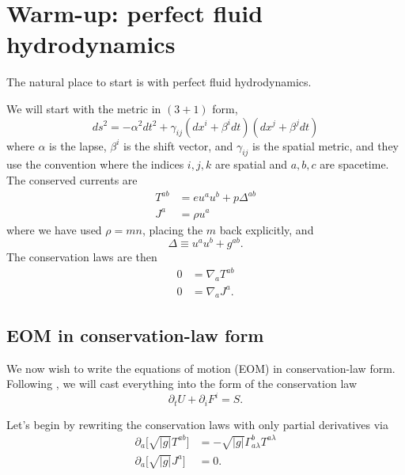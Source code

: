 \documentclass[12pt]{article}
\numberwithin{equation}{section}
\begin{document}
\appendix

\clearpage

\section{Warm-up: perfect fluid hydrodynamics}

The natural place to start is with perfect fluid hydrodynamics.

We will start with the metric in $(3+1)$ form,
\begin{equation}
ds^2 = - \alpha^2 dt^2 + \gamma_{ij} (dx^i + \beta^i dt) (dx^j + \beta^j dt)
\end{equation}
where $\alpha$ is the lapse, $\beta^{i}$ is the shift vector, and $\gamma_{ij}$
is the spatial metric, and they use the convention where the indices $i,j,k$
are spatial and $a,b,c$ are spacetime.
The conserved currents are
\begin{align}
T^{ab} &= e u^a u^b + p \Delta^{ab} \\
J^{a} &= \rho u^a
\end{align}
where we have used $\rho = m n$, placing the $m$ back explicitly, and
\begin{equation}
\Delta \equiv u^a u^b + g^{ab}.
\end{equation}
The conservation laws are then
\begin{align}
0 &= \nabla_{a} T^{ab} \\
0 &= \nabla_{a} J^{a}.
\end{align}

\subsection{EOM in conservation-law form}

We now wish to write the equations of motion (EOM) in conservation-law form.
Following \cite{BaumgarteShapiro}, we will cast everything into the form of the conservation law
\begin{equation}
\partial_t U + \partial_i F^{i} = S.
\end{equation}

Let's begin by rewriting the conservation laws with only partial derivatives via
\begin{align}
\partial_a \big[ \sqrt{|g|} T^{ab} \big] &= -\sqrt{|g|} \Gamma^{b}_{a \lambda} T^{a \lambda} \\
\partial_a \big[ \sqrt{|g|} J^{a} \big] &= 0.
\end{align}
\end{document}

